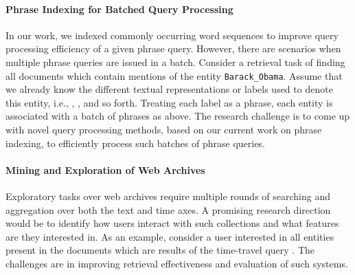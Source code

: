 \paragraph{Phrase Indexing for Batched Query Processing} In our work, we indexed commonly occurring word sequences to improve query processing efficiency of a given phrase query. However, there are scenarios when multiple phrase queries are issued in a batch. Consider a retrieval task of finding all documents which contain mentions of the entity \texttt{Barack\_Obama}. Assume that we already know the different textual representations or labels used to denote this entity, i.e., , ,  and so forth. Treating each label as a phrase, each entity is associated with a batch of phrases as above. The research challenge is to come up with novel query processing methods, based on our current work on phrase indexing, to efficiently process such batches of phrase queries. 

\paragraph{Mining and Exploration of Web Archives} 
 Exploratory tasks over web archives require multiple rounds of searching and aggregation over both the text and time axes. A promising research direction would be to identify how users interact with such collections and what features are they interested in. As an example, consider a user interested in all entities present in the documents which are results of the time-travel query . The challenges are in improving retrieval effectiveness and evaluation of such systems.


